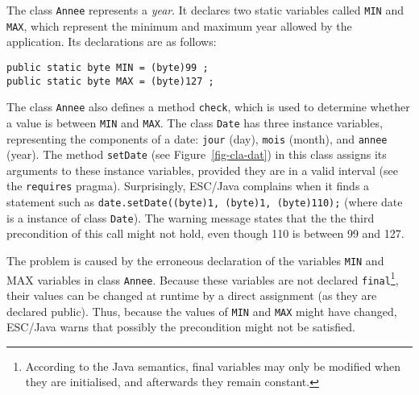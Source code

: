 \documentclass[a4paper]{llncs}
\begin{document}
The class \texttt{Annee} represents a \textit{year}. It 
declares two
static variables called \texttt{MIN} and \texttt{MAX}, which represent
the minimum and maximum year allowed by the application.
Its declarations are as follows:
\begin{verbatim}
public static byte MIN = (byte)99 ;
public static byte MAX = (byte)127 ;
\end{verbatim}

The class \texttt{Annee} also defines a method \texttt{check}, which is
used to determine whether a value is between \texttt{MIN} and \texttt{MAX}. The
class \texttt{Date} has three instance variables, representing the
components of a date: \texttt{jour} (day),
\texttt{mois} (month), and \texttt{annee} (year). The method
\texttt{setDate} (see Figure~\ref{fig-cla-dat})
in this class assigns its arguments to these
instance variables, provided they are in a valid interval (see the
\texttt{requires} pragma). %
Surprisingly, ESC/Java complains when it
finds a statement such as
\mbox{\tt date.setDate((byte)1, (byte)1, (byte)110);} (where date is a
instance of class \texttt{Date}). The warning message states that the
the third precondition of this call might not hold, even though 110 is 
between 99 and 127.

The problem is caused by the erroneous declaration of the variables 
\texttt{MIN} and \textsc{MAX} variables in class \texttt{Annee}.
Because these variables are not declared 
\texttt{final}\footnote{According to the Java semantics, final
variables may only be modified when they are initialised, and
afterwards they remain constant.}, their values can be
changed at runtime by
a direct assignment (as they are declared public). Thus, because the
values of \texttt{MIN} and \texttt{MAX} might have changed, ESC/Java
warns that possibly the precondition might not be satisfied.
\end{document}
